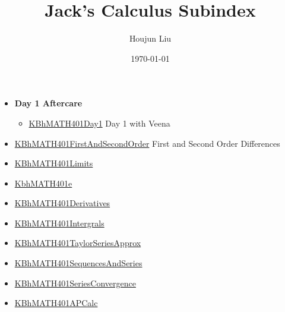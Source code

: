 \documentclass[letterpaper]{article}
\author{Houjun Liu}
\date{\today}
\title{Jack's Calculus Subindex}
\renewcommand{\tableofcontents}{}
\begin{document}
\tableofcontents

\begin{itemize}
\item \textbf{Day 1 Aftercare}

\begin{itemize}
\item \href{KBhMATH401Day1.org}{KBhMATH401Day1} Day 1 with Veena
\end{itemize}

\item \href{KBhMATH401FirstAndSecondOrder.org}{KBhMATH401FirstAndSecondOrder}
First and Second Order Differences
\item \href{KBhMATH401Limits.org}{KBhMATH401Limits}
\item \href{KbhMATH401e.org}{KbhMATH401e}
\item \href{KBhMATH401Derivatives.org}{KBhMATH401Derivatives}
\item \href{KBhMATH401Intergrals.org}{KBhMATH401Intergrals}
\item \href{KBhMATH401TaylorSeriesApprox.org}{KBhMATH401TaylorSeriesApprox}
\item \href{KBhMATH401SequencesAndSeries.org}{KBhMATH401SequencesAndSeries}
\item \href{KBhMATH401SeriesConvergence.org}{KBhMATH401SeriesConvergence}
\item \href{KBhMATH401APCalc.org}{KBhMATH401APCalc}
\end{itemize}
\end{document}
